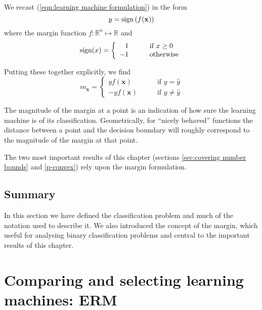 We recast (\ref{eqn:learning machine formulation}) in the form
%
\begin{equation}
y = \mathrm{sign} \left( f(\mathbf{x}) \right)
\label{eqn:marginal classification formulation}
\end{equation}
%
where the margin function $f : \mathbb{R}^n \mapsto \mathbb{R}$ and
%
\begin{equation}
\mathrm{sign} (x) = \left\{ \begin{array}{rl}
1	& \qquad \mbox{if $x \geq 0$} \\
-1	& \qquad \mbox{otherwise}
\end{array} \right.
\end{equation}
%

Putting these together explicitly, we find
%
\begin{equation}
m_{\mathbf{x}} = \left\{ \begin{array}{rl}
yf(\mathbf{x})	& \qquad \mbox{if $y = \hat{y}$} \\
-yf(\mathbf{x})	& \qquad \mbox{if $y \neq \hat{y}$}
\end{array} \right.
\label{eqn:margin definition}
\end{equation}

The magnitude of the margin at a point is an indication of how sure the
learning machine is of its classification.  Geometrically, for
``nicely behaved'' functions the distance between a point and the
decision boundary will roughly correspond to the magnitude of the
margin at that point.

The two most important results of this chapter (sections
\ref{sec:covering number bounds} and \ref{p-convex}) rely upon the
margin formulation.


\subsection{Summary}

In this section we have defined the classification problem and much of
the notation used to describe it.  We also introduced the concept of
the margin, which useful for analysing binary classification
problems and central to the important results of this chapter.



\section{Comparing and selecting learning machines: ERM}
\label{sec:erm}


